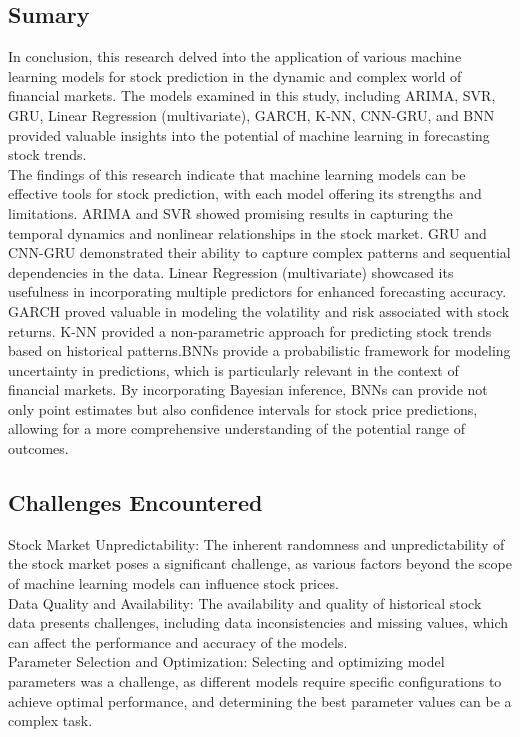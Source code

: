 \documentclass{ieeeojies}
\begin{document}
\subsection{Sumary}
In conclusion, this research delved into the application of various machine learning models for stock prediction in the dynamic and complex world of financial markets. The models examined in this study, including ARIMA, SVR, GRU, Linear Regression (multivariate), GARCH, K-NN, CNN-GRU, and BNN  provided valuable insights into the potential of machine learning in forecasting stock trends. \\
The findings of this research indicate that machine learning models can be effective tools for stock prediction, with each model offering its strengths and limitations. ARIMA and SVR showed promising results in capturing the temporal dynamics and nonlinear relationships in the stock market. GRU and CNN-GRU demonstrated their ability to capture complex patterns and sequential dependencies in the data. Linear Regression (multivariate) showcased its usefulness in incorporating multiple predictors for enhanced forecasting accuracy. GARCH proved valuable in modeling the volatility and risk associated with stock returns. K-NN provided a non-parametric approach for predicting stock trends based on historical patterns.BNNs provide a probabilistic framework for modeling uncertainty in predictions, which is particularly relevant in the context of financial markets. By incorporating Bayesian inference, BNNs can provide not only point estimates but also confidence intervals for stock price predictions, allowing for a more comprehensive understanding of the potential range of outcomes.

\subsection{Challenges Encountered}
Stock Market Unpredictability: The inherent randomness and unpredictability of the stock market poses a significant challenge, as various factors beyond the scope of machine learning models can influence stock prices.\\
Data Quality and Availability: The availability and quality of historical stock data presents challenges, including data inconsistencies and missing values, which can affect the performance and accuracy of the models.\\
Parameter Selection and Optimization: Selecting and optimizing model parameters was a challenge, as different models require specific configurations to achieve optimal performance, and determining the best parameter values can be a complex task.
\end{document}
